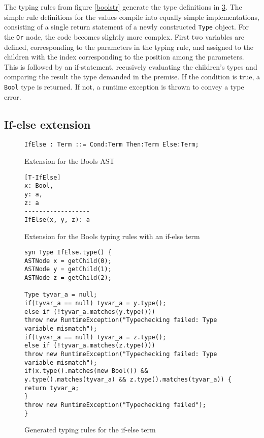 \documentclass[nofilelist]{cslthse-msc}
\begin{document}
The typing rules from figure \ref{boolstr} generate the type definitions in \ref{boolstrgen}.
The simple rule definitions for the values compile into equally simple implementations, consisting of a single return statement of a newly constructed \verb|Type| object.
For the \verb|Or| node, the code becomes slightly more complex.
First two variables are defined, corresponding to the parameters in the typing rule, and assigned to the children with the index corresponding to the position among the parameters.
This is followed by an if-statement, recusively evaluating the children's types and comparing the result the type demanded in the premise.
If the condition is true, a \verb|Bool| type is returned.
If not, a runtime exception is thrown to convey a type error.

\subsection{If-else extension}

\begin{figure}[h]
\begin{lstlisting}[]
IfElse : Term ::= Cond:Term Then:Term Else:Term;
\end{lstlisting}
  \caption{Extension for the Bools AST}
  \label{ifelseast}
\end{figure}
\begin{figure}[h]
\begin{lstlisting}[]
[T-IfElse]
x: Bool,
y: a,
z: a
------------------
IfElse(x, y, z): a
\end{lstlisting}
  \caption{Extension for the Bools typing rules with an if-else term}
  \label{ifelsetr}
\end{figure}
\begin{figure}[h]
\begin{lstlisting}[]
syn Type IfElse.type() {
ASTNode x = getChild(0);
ASTNode y = getChild(1);
ASTNode z = getChild(2);

Type tyvar_a = null;
if(tyvar_a == null) tyvar_a = y.type();
else if (!tyvar_a.matches(y.type()))
throw new RuntimeException("Typechecking failed: Type variable mismatch");
if(tyvar_a == null) tyvar_a = z.type();
else if (!tyvar_a.matches(z.type()))
throw new RuntimeException("Typechecking failed: Type variable mismatch");
if(x.type().matches(new Bool()) && y.type().matches(tyvar_a) && z.type().matches(tyvar_a)) {
return tyvar_a;
}
throw new RuntimeException("Typechecking failed");
}
\end{lstlisting}
  \caption{Generated typing rules for the if-else term}
  \label{boolstrgen}
\end{figure}
\end{document}
